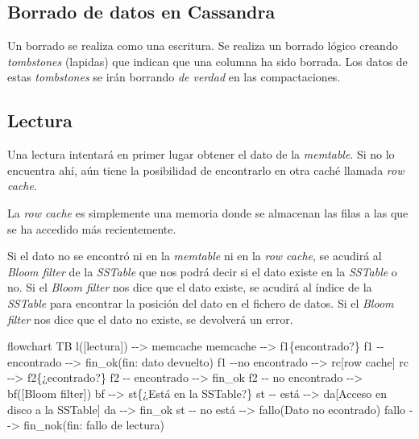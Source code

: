 \documentclass[
]{book}
\newenvironment{Shaded}{}{}
\newcommand{\NormalTok}[1]{#1}
\begin{document}
\subsection{Borrado de datos en Cassandra}\label{borrado-de-datos-en-cassandra}

Un borrado se realiza como una escritura. Se realiza un borrado lógico creando \emph{tombstones} (lapidas) que indican que una columna ha sido borrada. Los datos de estas \emph{tombstones} se irán borrando \emph{de verdad} en las compactaciones.

\subsection{Lectura}\label{lectura}

Una lectura intentará en primer lugar obtener el dato de la \emph{memtable}. Si no lo encuentra ahí, aún tiene la posibilidad de encontrarlo en otra caché llamada \emph{row cache}.

La \emph{row cache} es simplemente una memoria donde se almacenan las filas a las que se ha accedido más recientemente.

Si el dato no se encontró ni en la \emph{memtable} ni en la \emph{row cache}, se acudirá al \emph{Bloom filter} de la \emph{SSTable} que nos podrá decir si el dato existe en la \emph{SSTable} o no. Si el \emph{Bloom filter} nos dice que el dato existe, se acudirá al índice de la \emph{SSTable} para encontrar la posición del dato en el fichero de datos. Si el \emph{Bloom filter} nos dice que el dato no existe, se devolverá un error.

\begin{Shaded}
\begin{Highlighting}[]
\NormalTok{flowchart TB}
\NormalTok{l([lectura]) {-}{-}\textgreater{} memcache}
\NormalTok{memcache {-}{-}\textgreater{} f1\{encontrado?\}}
\NormalTok{f1 {-}{-}encontrado {-}{-}\textgreater{} fin\_ok(fin: dato devuelto)}
\NormalTok{f1 {-}{-}no encontrado {-}{-}\textgreater{} rc[row cache]}
\NormalTok{rc {-}{-}\textgreater{} f2\{¿econtrado?\}}
\NormalTok{f2 {-}{-} encontrado {-}{-}\textgreater{} fin\_ok}
\NormalTok{f2 {-}{-} no encontrado {-}{-}\textgreater{} bf([Bloom filter])}
\NormalTok{bf {-}{-}\textgreater{} st\{¿Está en la}
\NormalTok{SSTable?\}}
\NormalTok{st {-}{-} está {-}{-}\textgreater{} da[Acceso en disco}
\NormalTok{a la SSTable]}
\NormalTok{da {-}{-}\textgreater{} fin\_ok}
\NormalTok{st {-}{-} no está {-}{-}\textgreater{} fallo(Dato no econtrado)}
\NormalTok{fallo {-}{-}\textgreater{} fin\_nok(fin: fallo de lectura)}
\end{Highlighting}
\end{Shaded}
\end{document}
